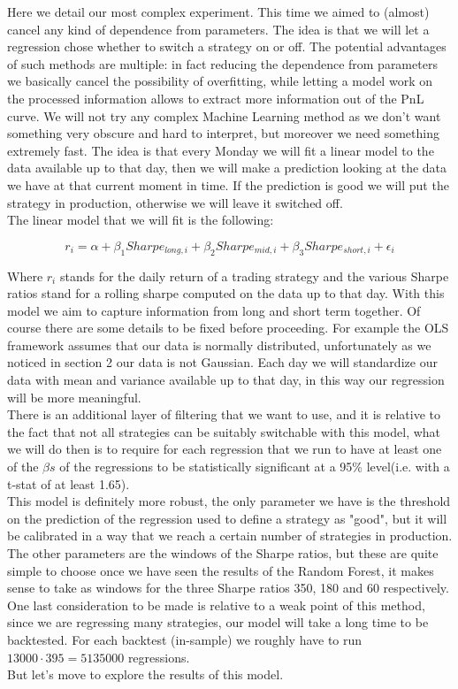 Here we detail our most complex experiment. This time we aimed to (almost) cancel any kind of dependence from parameters. The idea is that we will let a regression chose whether to switch a strategy on or off. The potential advantages of such methods are multiple: in fact reducing the dependence from parameters we basically cancel the possibility of overfitting, while letting a model work on the processed information allows to extract more information out of the PnL curve. We will not try any complex Machine Learning method as we don't want something very obscure and hard to interpret, but moreover we need something extremely fast. The idea is that every Monday we will fit a linear model to the data available up to that day, then we will make a prediction looking at the data we have at that current moment in time. If the prediction is good we will put the strategy in production, otherwise we will leave it switched off.\\
The linear model that we will fit is the following:

\begin{equation} \label{OLS}
r_i = \alpha + \beta_1 Sharpe_{long,i} + \beta_2 Sharpe_{mid,i} + \beta_3 Sharpe_{short,i}  + \epsilon_i 
\end{equation}

Where $r_i$ stands for the daily return of a trading strategy and the various Sharpe ratios stand for a rolling sharpe computed on the data up to that day. With this model we aim to capture information from long and short term together. Of course there are some details to be fixed before proceeding. For example the OLS framework assumes that our data is normally distributed, unfortunately as we noticed in section 2 our data is not Gaussian. Each day we will standardize our data with mean and variance available up to that day, in this way our regression will be more meaningful.\\
There is an additional layer of filtering that we want to use, and it is relative to the fact that not all strategies can be suitably switchable with this model, what we will do then is to require for each regression that we run to have at least one of the $\beta s$ of the regressions to be statistically significant at a 95\% level(i.e. with a t-stat of at least 1.65).\\
This model is definitely more robust, the only parameter we have is the threshold on the prediction of the regression used to define a strategy as "good", but it will be calibrated in a way that we reach a certain number of strategies in production. The other parameters are the windows of the Sharpe ratios, but these are quite simple to choose once we have seen the results of the Random Forest, it makes sense to take as windows for the three Sharpe ratios 350, 180 and 60 respectively.\\
One last  consideration to be made is relative to a weak point of this method, since we are regressing many strategies, our model will take a long time to be backtested. For each backtest (in-sample) we roughly have to run $13000 \cdot 395 = 5135000$ regressions.\\
But let's move to explore the results of this model. 


